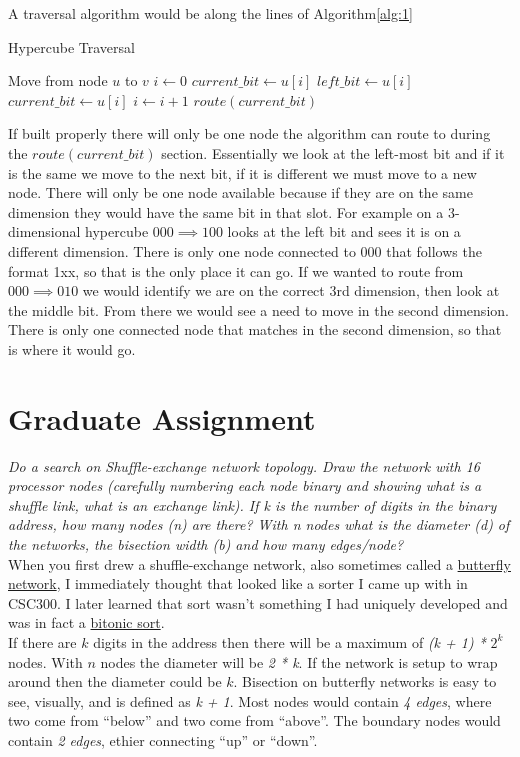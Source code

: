 \documentclass{article}
\begin{document}
\noindent A traversal algorithm would be along the lines of Algorithm\ref{alg:1}\\
\begin{algorithm}[H]
\caption{Hypercube Traversal}
\label{alg:1}
\Statex Move from node $u$ to $v$
\State $i\gets 0$
\State $current\_bit\gets u[i]$
\State $left\_bit\gets u[i]$
    \State $current\_bit\gets u[i]$
        \State $i\gets i+1$
    \Else
        \State $route(current\_bit)$ 
    \EndIf
\EndWhile
\end{algorithm}

If built properly there will only be one node the algorithm can route to during the $route(current\_bit)$ section. Essentially we look at the left-most bit and if it is the same we move to the next bit, if it is different we must move to a new node. There will only be one node available because if they are on the same dimension they would have the same bit in that slot. For example on a 3-dimensional hypercube $000 \implies 100$ looks at the left bit and sees it is on a different dimension. There is only one node connected to 000 that follows the format 1xx, so that is the only place it can go. If we wanted to route from $000 \implies 010$ we would identify we are on the correct 3rd dimension, then look at the middle bit. From there we would see a need to move in the second dimension. There is only one connected node that matches in the second dimension, so that is where it would go.


\newpage
\section{Graduate Assignment}
\textit{Do a search on Shuffle-exchange network topology.  
Draw the network with 16 processor nodes (carefully numbering each node binary and showing what is a shuffle link, what is an exchange link).  If k is the number of digits in the binary address, how many nodes (n) are there?  With n nodes what is the diameter (d) of the networks, the bisection width (b) and how many edges/node?}\\

When you first drew a shuffle-exchange network, also sometimes called a \href{https://en.wikipedia.org/wiki/Butterfly_network}{butterfly network}, I immediately thought that looked like a sorter I came up with in CSC300. I later learned that sort wasn't something I had uniquely developed and was in fact a \href{https://en.wikipedia.org/wiki/Bitonic_sorter}{bitonic sort}.\\

If there are $k$ digits in the address then there will be a maximum of \textit{(k + 1) *} $2^k$ nodes. With $n$ nodes the diameter will be \textit{2 * k}. If the network is setup to wrap around then the diameter could be $k$. Bisection on butterfly networks is easy to see, visually, and is defined as \textit{k + 1}. Most nodes would contain \textit{4 edges}, where two come from ``below'' and two come from ``above''. The boundary nodes would contain \textit{2 edges}, ethier connecting ``up'' or ``down''.
\end{document}
